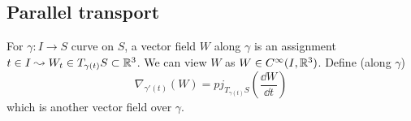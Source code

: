 \subsection{Parallel transport}
For  $ \gamma:I\rightarrow S  $ curve on  $ S $, a vector field  $ W  $ along  $ \gamma $ is an assignment  $ t\in I\leadsto W_t\in T_{\gamma(t)}S\subset\mathbb R^3 $. We can view  $ W  $ as  $ W\in C^\infty(I,\mathbb R^3) $. Define  (along  $ \gamma $)
\[\nabla_{\gamma'(t)}(W)=pj_{T_{\gamma(t)}S}\left(\frac{\dd W}{\dd t}\right)\] 
which is another vector field over  $ \gamma $.     
